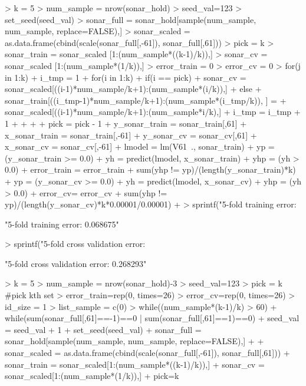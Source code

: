 \documentclass{article}
\begin{document}
\begin{Schunk}
\begin{Sinput}
> k = 5
> num_sample = nrow(sonar_hold)
> seed_val=123
> set_seed(seed_val)
> sonar_full = sonar_hold[sample(num_sample, num_sample, replace=FALSE),]
> sonar_scaled = as.data.frame(cbind(scale(sonar_full[,-61]), sonar_full[,61]))
> pick = k 
> sonar_train = sonar_scaled [1:(num_sample*((k-1)/k)),]
> sonar_cv = sonar_scaled [1:(num_sample*(1/k)),]
> error_train = 0
> error_cv = 0
> for(j in 1:k){
+   i_tmp = 1
+   for(i in 1:k){ 
+     if(i == pick){
+       sonar_cv = sonar_scaled[((i-1)*num_sample/k+1):(num_sample*(i/k)),]
+     } else {
+       sonar_train[((i_tmp-1)*num_sample/k+1):(num_sample*(i_tmp/k)), ] = 
+         sonar_scaled[((i-1)*num_sample/k+1):(num_sample*i/k),]
+       i_tmp = i_tmp + 1
+     }
+   }
+  
+   pick = pick - 1
+   y_sonar_train = sonar_train[,61]
+   x_sonar_train = sonar_train[,-61]
+   y_sonar_cv = sonar_cv[,61]
+   x_sonar_cv = sonar_cv[,-61]
+   lmodel = lm(V61~., sonar_train)
+   yp = (y_sonar_train >= 0.0)
+   yh = predict(lmodel, x_sonar_train)
+   yhp = (yh > 0.0)
+   error_train = error_train + sum(yhp != yp)/(length(y_sonar_train)*k)
+   yp = (y_sonar_cv >= 0.0)
+   yh = predict(lmodel, x_sonar_cv)
+   yhp = (yh > 0.0)
+   error_cv= error_cv + sum(yhp != yp)/(length(y_sonar_cv)*k*0.00001/0.00001)
+   }
> sprintf("5-fold training error: %f", error_train)
\end{Sinput}
\begin{Soutput}
[1] "5-fold training error: 0.068675"
\end{Soutput}
\begin{Sinput}
> sprintf("5-fold cross validation error: %f", error_cv)
\end{Sinput}
\begin{Soutput}
[1] "5-fold cross validation error: 0.268293"
\end{Soutput}
\begin{Sinput}
> k = 5
> num_sample = nrow(sonar_hold)-3
> seed_val=123
> pick = k #pick kth set
> error_train=rep(0, times=26)
> error_cv=rep(0, times=26)
> id_size = 1 
> list_sample = c(0)
> while((num_sample*(k-1)/k) > 60){
+ while(sum(sonar_full[,61]==-1)==0 | sum(sonar_full[,61]==1)==0){
+ seed_val = seed_val + 1
+ set_seed(seed_val)
+ sonar_full = sonar_hold[sample(num_sample, num_sample, replace=FALSE),]
+   }
+ sonar_scaled = as.data.frame(cbind(scale(sonar_full[,-61]), sonar_full[,61]))
+ sonar_train = sonar_scaled[1:(num_sample*((k-1)/k)),]
+ sonar_cv = sonar_scaled[1:(num_sample*(1/k)),]
+ pick=k
}
\end{Sinput}
\end{Schunk}
\end{document}
